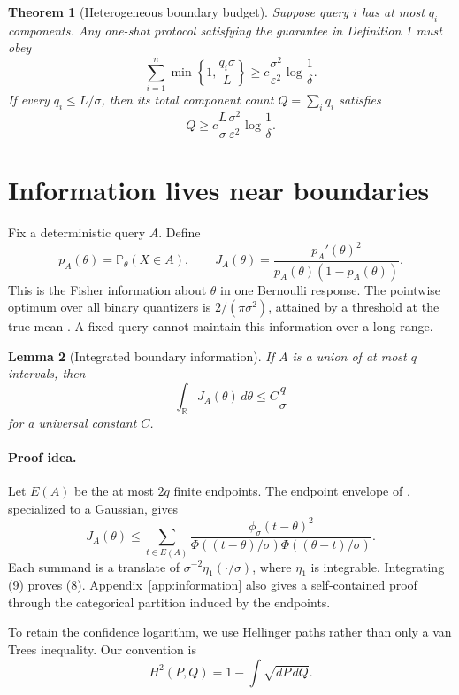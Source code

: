 \documentclass{article}
\newtheorem{theorem}{Theorem}
\newtheorem{lemma}[theorem]{Lemma}
\theoremstyle{definition}
\theoremstyle{remark}
\newcommand{\Prb}{\mathbb P}
\newcommand{\R}{\mathbb R}
\newcommand{\1}{\mathbf 1}
\begin{document}
\begin{theorem}[Heterogeneous boundary budget]\label{thm:heterogeneous}
Suppose query \(i\) has at most \(q_i\) components. Any one-shot protocol satisfying the guarantee in Definition 1 must obey \[ \sum_{i=1}^n\min\left\{1,\frac{q_i\sigma}{L}\right\} \geq c\frac{\sigma^2}{\varepsilon^2}\log\frac1\delta . \tag{6} \] If every \(q_i\leq L/\sigma\), then its total component count \(Q=\sum_iq_i\) satisfies \[ Q\geq c\frac{L}{\sigma}\frac{\sigma^2}{\varepsilon^2}\log\frac1\delta . \tag{7} \]
\end{theorem}

\section{Information lives near boundaries}

Fix a deterministic query \(A\). Define \[ p_A(\theta)=\Prb_\theta(X\in A),\qquad J_A(\theta)=\frac{p_A'(\theta)^2}{p_A(\theta)(1-p_A(\theta))}. \] This is the Fisher information about \(\theta\) in one Bernoulli response. The pointwise optimum over all binary quantizers is \(2/(\pi\sigma^2)\), attained by a threshold at the true mean \citep{barnes2018geometric}. A fixed query cannot maintain this information over a long range.

\begin{lemma}[Integrated boundary information]\label{lem:integrated}
If \(A\) is a union of at most \(q\) intervals, then \[ \int_{\R}J_A(\theta)\,d\theta\leq C\frac q\sigma \tag{8} \] for a universal constant \(C\).
\end{lemma}

\paragraph{Proof idea.} Let \(E(A)\) be the at most \(2q\) finite endpoints. The endpoint envelope of \citet[Lemma 11]{kipnis2022mean}, specialized to a Gaussian, gives
\[ J_A(\theta) \leq\sum_{t\in E(A)} \frac{\phi_\sigma(t-\theta)^2} {\Phi((t-\theta)/\sigma)\Phi((\theta-t)/\sigma)}. \tag{9} \] Each summand is a translate of \(\sigma^{-2}\eta_1(\cdot/\sigma)\), where \(\eta_1\) is integrable. Integrating (9) proves (8). Appendix~\ref{app:information} also gives a self-contained proof through the categorical partition induced by the endpoints.

To retain the confidence logarithm, we use Hellinger paths rather than only a van Trees inequality. Our convention is \[ H^2(P,Q)=1-\int\sqrt{dP\,dQ}. \]
\end{document}
